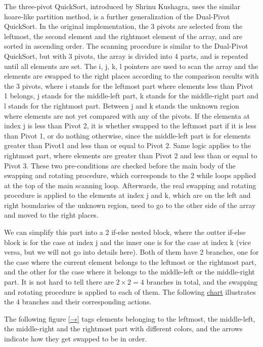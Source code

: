 \documentclass[a4paper,oneside,12pt]{book}
\begin{document}
The three-pivot QuickSort, introduced by Shrinu Kushagra, uses the similar hoare-like partition method, is a further generalization of the Dual-Pivot QuickSort.
In the original implementation, the 3 pivots are selected from the leftmost, the second element and the rightmost element of the array, and are sorted in ascending order.
The scanning procedure is similar to the Dual-Pivot QuickSort, but with 3 pivots, the array is divided into 4 parts, and is repeated until all elements are set.
The i, j, k, l pointers are used to scan the array and the elements are swapped to the right places according to the comparison results with the 3 pivots,
where i stands for the leftmost part where elements less than Pivot 1 belongs, j stands for the middle-left part, k stands for the middle-right part and l stands for the rightmost part.
Between j and k stands the unknown region where elements are not yet compared with any of the pivots. 
If the elementa at index j is less than Pivot 2, it is whether swapped to the leftmost part if it is less than Pivot 1,
or do nothing otherwise, since the middle-left part is for elements greater than Pivot1 and less than or equal to Pivot 2.
Same logic applies to the rightmost part, where elements are greater than Pivot 2 and less than or equal to Pivot 3.
These two pre-conditions are checked before the main body of the swapping and rotating procedure, which corresponds to the 2 while loops applied at the top of the main scanning loop.
Afterwards, the real swapping and rotating procedure is applied to the elements at index j and k, which are on the left and right boundaries of the unknown region, need to go to the other side of the array and moved to the right places.

We can simplify this part into a 2 if-else nested block, where the outter if-else block is for the case at index j and the inner one is for the case at index k (vice versa, but we will not go into details here).
Both of them have 2 branches, one for the case where the current element belongs to the leftmost or the rightmost part, and the other for the case where it belongs to the middle-left or the middle-right part.
It is not hard to tell there are $2 \times 2 = 4$ branches in total, and the swapping and rotating procedure is applied to each of them. The following \hyperlink{fig:3pivot}{chart} illustrates the 4 branches and their corresponding actions.

The following figure \hyperlink{fig:3pivot}{[→]} tags elements belonging to the leftmost, the middle-left, the middle-right and the rightmost part with different colors, and the arrows indicate how they get swapped to be in order.
\end{document}
